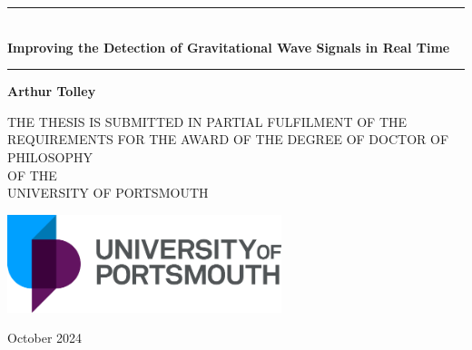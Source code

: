 \begin{titlepage}
   \begin{center}

        \vspace*{2cm}

   
        \rule{\textwidth}{0.4pt}\\
        \vspace{0.4cm}
        \Huge \textbf{Improving the Detection of Gravitational Wave Signals in Real Time}
        \rule{\textwidth}{0.4pt}

        \vspace{1.0cm}
        \textbf{Arthur Tolley}

        \vspace{1.5cm}
            
        {\large THE THESIS IS SUBMITTED IN PARTIAL FULFILMENT OF THE REQUIREMENTS FOR THE AWARD OF THE DEGREE OF DOCTOR OF PHILOSOPHY}\\
        {\large OF THE}\\
        {\large UNIVERSITY OF PORTSMOUTH}

        \vspace{3.0cm}
     
       \includegraphics[width=0.6\textwidth]{images/UoP_Logo.pdf}
            
        \large October 2024
            
   \end{center}
\end{titlepage}